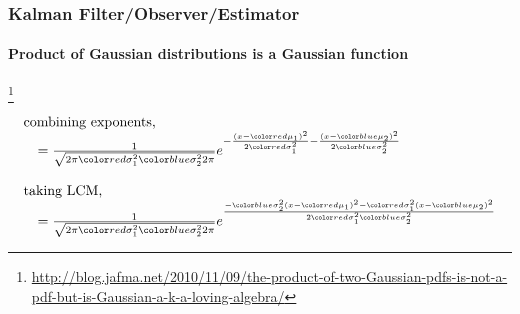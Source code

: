 \documentclass{beamer}
\newenvironment{changemargin}[2]
	{
	  	\begin{list}{}
		{
			\setlength{\topsep}{0pt}%
			\setlength{\leftmargin}{#1}%
			\setlength{\rightmargin}{#2}%
			\setlength{\listparindent}{\parindent}%
			\setlength{\itemindent}{\parindent}%
			\setlength{\parsep}{\parskip}%
		}
	  	\item[]
		}
		{\end{list}
	}
\begin{document}
\begin{frame}
\frametitle{Kalman Filter/Observer/Estimator}
\framesubtitle{Product of Gaussian distributions is a Gaussian function}

\footnote{\tiny\hspace{-0.23in} \hspace{-0.25in}
\href{http://blog.jafma.net/2010/11/09/the-product-of-two-Gaussian-pdfs-is-not-a-pdf-but-is-Gaussian-a-k-a-loving-algebra/}{http://blog.jafma.net/2010/11/09/the-product-of-two-Gaussian-pdfs-is-not-a-pdf-but-is-Gaussian-a-k-a-loving-algebra/}}
\scriptsize
\begin{equation*}
\begin{array}{llll}



\multicolumn{2}{l}{\textrm{combining exponents,}}\\
&=\frac{1}{\sqrt{2 \pi \varone \vartwo 2 \pi }}         e^{ -\frac{(x-\muone)^2}{2 \varone} - \frac{(x-\mutwo)^2}{2 \vartwo} } \\\\

\multicolumn{2}{l}{\textrm{taking LCM,}}\\
&=    \frac{1}{\sqrt{2 \pi \varone \vartwo 2 \pi }}         e^{ \frac{ - \vartwo (x-\muone)^2 - \varone (x-\mutwo)^2 } { 2 \varone \vartwo } }\\


\end{array}
\end{equation*}
\end{frame}
\end{document}
